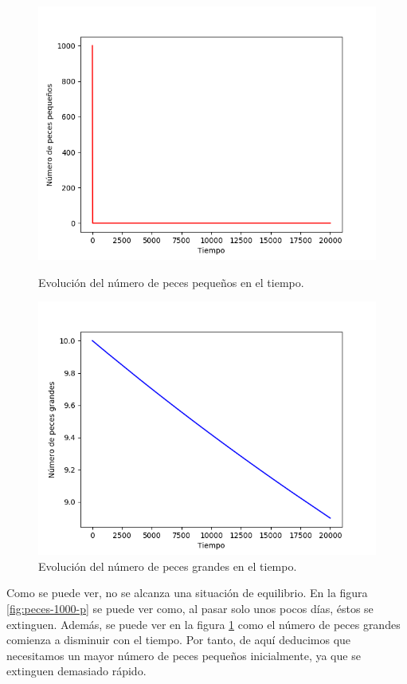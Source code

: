 \documentclass[11pt,a4paper]{report}
\begin{document}
\begin{figure}[H]
\centering
\begin{minipage}{.5\textwidth}
  \centering
  \includegraphics[scale=0.4]{img/peces-1000-1.png}
  \caption{Evolución del número de peces pequeños en el tiempo.}
  \label{fig:peces-1000-p}
\end{minipage}%
\begin{minipage}{.5\textwidth}
  \centering
  \includegraphics[scale=0.4]{img/peces-1000-2.png}
  \caption{Evolución del número de peces grandes en el tiempo.}
  \label{fig:peces-1000-g}
\end{minipage}
\end{figure}

Como se puede ver, no se alcanza una situación de equilibrio. En la figura \ref{fig:peces-1000-p} se puede ver como, al pasar
solo unos pocos días, éstos se extinguen. Además, se puede ver en la figura \ref{fig:peces-1000-g} como el número de peces
grandes comienza a disminuir con el tiempo. Por tanto, de aquí deducimos que necesitamos un mayor número de peces pequeños
inicialmente, ya que se extinguen demasiado rápido.
\end{document}
